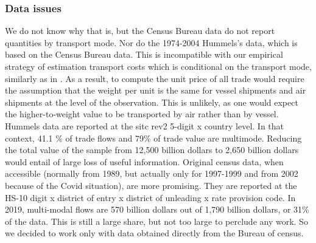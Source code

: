 \documentclass[a4paper,11pt]{article}
\begin{document}

\subsubsection{Data issues}

We do not know why that is, but the Census Bureau data do not report quantities by transport mode.
Nor do the 1974-2004 Hummels’s data, which is based on the Census Bureau data. 
This is incompatible with our empirical strategy of estimation transport costs which is conditional on the transport mode, similarly as in \cite{hummels2007}.
As a result, to compute the unit price of all trade would require the assumption that the weight per unit is the same for vessel shipments and air shipments at the level of the observation.
This is unlikely, as one would expect the higher-to-weight value to be transported by air rather than by vessel.
Hummels data are reported at the  sitc rev2 5-digit x  country level. In that context, 41.1 \% of trade flows and 79\% of trade value are multimode.
Reducing the total value of the sample from 12,500 billion dollars to 2,650 billion dollars would entail of large loss of useful information. 
Original census data, when accessible (normally from 1989, but actually only for 1997-1999 and from 2002 because of the Covid situation), are more promising.
They are reported at the HS-10 digit x district of entry x district of unleading x rate provision code.
In 2019, multi-modal flows are 570 billion dollars out of 1,790 billion dollars, or 31\% of the data.
This is still a large share, but not too large to perclude any work. 
So we decided to work only with data obtained directly from the Bureau of census. 

\end{document}
